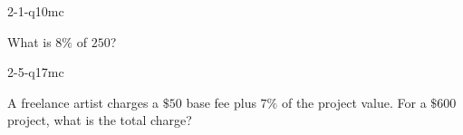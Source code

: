 \begin{practiceQuestion}{2-1-q10}{mc}
\begin{questionText}
What is $8\%$ of $250$?
\end{questionText}
\end{practiceQuestion}

\begin{practiceQuestion}{2-5-q17}{mc}
\begin{questionText}
A freelance artist charges a $\$50$ base fee plus $7\%$ of the project value. For a $\$600$ project, what is the total charge?


\end{questionText}
\end{practiceQuestion}


